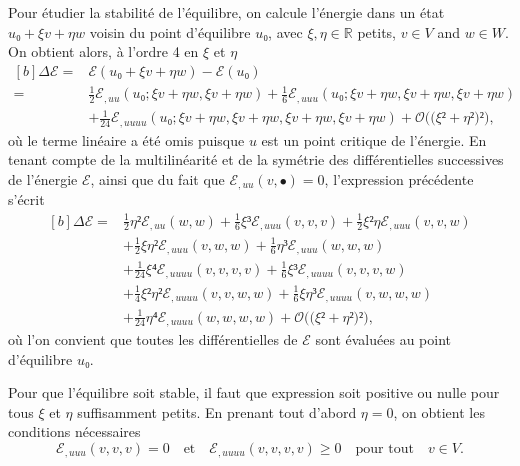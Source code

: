 \documentclass[12pt, final]{amsart}
\begin{document}
Pour étudier la stabilité de l'équilibre, on calcule l'énergie dans un état
\(u₀+ξ v+η w\) voisin du point d'équilibre \(u₀\), avec
\(ξ, η∈ℝ\) \guillemotleft{}petits\guillemotright{}, \(v∈ V\) and
\(w∈ W\). On obtient alors, à l'ordre 4 en \(ξ\) et \(η\)
\begin{equation}
  \begin{aligned}[b]
    Δℰ ={}&
    ℰ(u₀+ξ v+η w)-ℰ(u₀)\\
    ={}&\tfrac12ℰ_{,uu}(u₀;ξ v+η w, ξ v+η w)
    +\tfrac16ℰ_{,uuu}(u₀;ξ v+η w, ξ v+η w, ξ v+η w)\\
    &+\tfrac1{24}ℰ_{,uuuu}(u₀;ξ v+η w, ξ v+η w, ξ v+η w,
    ξ v+η w)+𝒪\bigl(\bigl(ξ²+η²\bigr)²\bigr),
  \end{aligned}
\end{equation}
où le terme linéaire a été omis puisque \(u\) est un point critique de
l'énergie. En tenant compte de la multilinéarité et de la symétrie des
différentielles successives de l'énergie \(ℰ\), ainsi que du fait que
\(ℰ_{,uu}(v, •)=0\), l'expression précédente s'écrit
\begin{equation}
  \begin{aligned}[b]
    Δℰ
    ={}&\tfrac12η²ℰ_{,uu}(w, w)
    +\tfrac16ξ³ℰ_{,uuu}(v, v, v)
    +\tfrac12ξ²ηℰ_{,uuu}(v, v, w)\\
    &+\tfrac12ξη²ℰ_{,uuu}(v, w, w)
    +\tfrac16η³ℰ_{,uuu}(w, w, w)\\
    &+\tfrac1{24}ξ⁴ℰ_{,uuuu}(v, v, v, v)
    +\tfrac16ξ³ℰ_{,uuuu}(v, v, v, w)\\
    &+\tfrac14ξ²η²ℰ_{,uuuu}(v, v, w, w)
    +\tfrac16ξη³ℰ_{,uuuu}(v, w, w, w)\\
    &+\tfrac1{24}η⁴ℰ_{,uuuu}(w, w, w, w)
    +𝒪\bigl(\bigl(ξ²+η²\bigr)²\bigr),
  \end{aligned}
\end{equation}
où l'on convient que toutes les différentielles de \(ℰ\) sont évaluées
au point d'équilibre \(u₀\).

Pour que l'équilibre soit stable, il faut que expression soit positive ou nulle
pour tous \(ξ\) et \(η\) suffisamment petits. En prenant tout d'abord
\(η=0\), on obtient les conditions nécessaires
\begin{equation}
  \label{eq:20211108164416}
  ℰ_{,uuu}(v, v, v)=0
  \quad\text{et}\quad
  ℰ_{,uuuu}(v, v, v, v)≥0
  \quad\text{pour tout}\quad v∈ V.
\end{equation}
\end{document}

